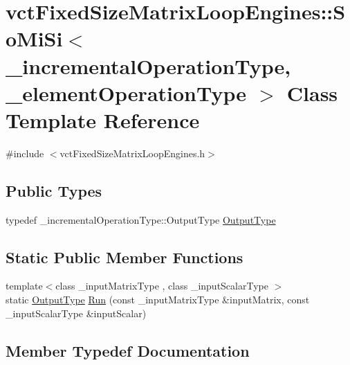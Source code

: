 \hypertarget{classvct_fixed_size_matrix_loop_engines_1_1_so_mi_si}{}\section{vct\+Fixed\+Size\+Matrix\+Loop\+Engines\+:\+:So\+Mi\+Si$<$ \+\_\+incremental\+Operation\+Type, \+\_\+element\+Operation\+Type $>$ Class Template Reference}
\label{classvct_fixed_size_matrix_loop_engines_1_1_so_mi_si}


{\ttfamily \#include $<$vct\+Fixed\+Size\+Matrix\+Loop\+Engines.\+h$>$}

\subsection*{Public Types}
\begin{DoxyCompactItemize}
\item 
typedef \+\_\+incremental\+Operation\+Type\+::\+Output\+Type \hyperlink{classvct_fixed_size_matrix_loop_engines_1_1_so_mi_si_ac5487cd61e043f96d0d4a5310c2b04f4}{Output\+Type}
\end{DoxyCompactItemize}
\subsection*{Static Public Member Functions}
\begin{DoxyCompactItemize}
\item 
{\footnotesize template$<$class \+\_\+input\+Matrix\+Type , class \+\_\+input\+Scalar\+Type $>$ }\\static \hyperlink{classvct_fixed_size_matrix_loop_engines_1_1_so_mi_si_ac5487cd61e043f96d0d4a5310c2b04f4}{Output\+Type} \hyperlink{classvct_fixed_size_matrix_loop_engines_1_1_so_mi_si_a9ea8058fce286e2263e3df5988a85efb}{Run} (const \+\_\+input\+Matrix\+Type \&input\+Matrix, const \+\_\+input\+Scalar\+Type \&input\+Scalar)
\end{DoxyCompactItemize}


\subsection{Member Typedef Documentation}
\hypertarget{classvct_fixed_size_matrix_loop_engines_1_1_so_mi_si_ac5487cd61e043f96d0d4a5310c2b04f4}{}
